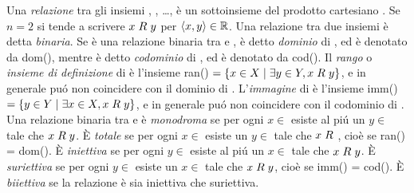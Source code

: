Una \textit{relazione} tra gli insiemi , , \dots,  è un sottoinsieme  del prodotto cartesiano . Se $n = 2$ si tende a scrivere $x \hspace{1mm} R \hspace{1mm} y$ per $\langle x, y \rangle \in \mathbb{R}$. Una relazione tra due insiemi è detta \textit{binaria}. Se  è una relazione binaria tra  e ,  è detto \textit{dominio} di , ed è denotato da dom(), mentre  è detto \textit{codominio} di , ed è denotato da cod(). Il \textit{rango} o \textit{insieme di definizione} di  è l'insieme ran() $ = \{x \in X \hspace{1mm}|\hspace{1mm} \exists y \in Y, x \hspace{1mm} R \hspace{1mm} y\}$, e in generale puó non coincidere con il dominio di . L'\textit{immagine} di  è l'insieme imm() $= \{y \in Y \hspace{1mm}|\hspace{1mm} \exists x \in X, x \hspace{1mm} R \hspace{1mm} y\}$, e in generale puó non coincidere con il codominio di . Una relazione binaria  tra  e  è \textit{monodroma} se per ogni $x \in$  esiste al piú un $y \in$  tale che $x \hspace{1mm} R \hspace{1mm} y$. È \textit{totale} se per ogni $x \in$  esiste un $y \in$  tale che $x \hspace{1mm} R \hspace{1mm}$, cioè se ran() = dom(). È \textit{iniettiva} se per ogni $y \in$  esiste al piú un $x \in$  tale che $x \hspace{1mm} R \hspace{1mm} y$. È \textit{suriettiva} se per ogni $y \in$  esiste un $x \in$  tale che $x \hspace{1mm} R \hspace{1mm} y$, cioè se imm() = cod(). È \textit{biiettiva} se la relazione è sia iniettiva che suriettiva.
